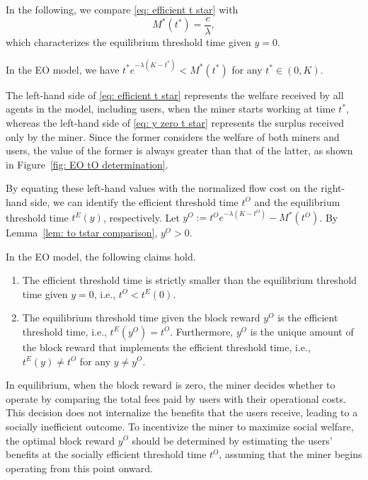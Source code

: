 \documentclass[12pt, letterpaper]{article}
\begin{document}
In the following, we compare \eqref{eq: efficient t star} with
\begin{equation}\label{eq: y zero t star}
    M^*(t^*) = \frac{c}{\lambda},
\end{equation}
which characterizes the equilibrium threshold time given $y = 0$.

\begin{lem}\label{lem: to tstar comparison}
    In the EO model,  we have
        $t^* e^{-\lambda (K - t^*)} < M^*(t^*)$ for any $t^* \in (0, K)$.
\end{lem}




The left-hand side of \eqref{eq: efficient t star} represents the welfare received by all agents in the model, including users, when the miner starts working at time $t^*$, whereas the left-hand side of \eqref{eq: y zero t star} represents the surplus received only by the miner. Since the former considers the welfare of both miners and users, the value of the former is always greater than that of the latter, as shown in Figure~\ref{fig: EO tO determination}.

By equating these left-hand values with the normalized flow cost on the right-hand side, we can identify the efficient threshold time $t^O$ and the equilibrium threshold time $t^E(y)$, respectively. Let $y^O:=t^O e^{-\lambda (K - t^O)} - M^*(t^O)$. By Lemma~\ref{lem: to tstar comparison}, $y^O > 0$.



\begin{thm}
    In the EO model, the following claims hold.
    \begin{enumerate}
        \item The efficient threshold time is strictly smaller than the equilibrium threshold time given $y = 0$, i.e., $t^O < t^E(0)$.
        \item The equilibrium threshold time given the block reward $y^O$ is the efficient threshold time, i.e., $t^E(y^O) = t^O$. Furthermore, $y^O$ is the unique amount of the block reward that implements the efficient threshold time, i.e., $t^E(y) \neq t^O$ for any $y \neq y^O$.
    \end{enumerate}
\end{thm}

In equilibrium, when the block reward is zero, the miner decides whether to operate by comparing the total fees paid by users with their operational costs. This decision does not internalize the benefits that the users receive, leading to a socially inefficient outcome. To incentivize the miner to maximize social welfare, the optimal block reward $y^O$ should be determined by estimating the users' benefits at the socially efficient threshold time $t^O$, assuming that the miner begins operating from this point onward.
\end{document}
